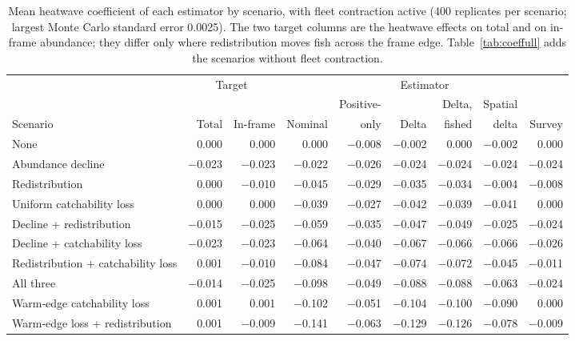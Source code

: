 \documentclass[11pt,a4paper]{article}
\begin{document}
\begin{table}[tbp]
\centering\footnotesize
\setlength{\tabcolsep}{3.5pt}
\caption{Mean heatwave coefficient of each estimator by scenario, with fleet contraction active (400 replicates per scenario; largest Monte Carlo standard error 0.0025). The two target columns are the heatwave effects on total and on in-frame abundance; they differ only where redistribution moves fish across the frame edge. Table~\ref{tab:coeffull} adds the scenarios without fleet contraction.}
\label{tab:coef}
\begin{tabular}{@{}>{\raggedright\arraybackslash}p{3.2cm}rrrrrrrr@{}}
\toprule
 & \multicolumn{2}{c}{Target} & \multicolumn{6}{c}{Estimator} \\
\cmidrule(lr){2-3}\cmidrule(l){4-9}
 & & & & Positive- & & Delta, & Spatial & \\
Scenario & Total & In-frame & Nominal & only & Delta & fished & delta & Survey \\
\midrule
None & 0.000 & 0.000 & 0.000 & $-$0.008 & $-$0.002 & 0.000 & $-$0.002 & 0.000 \\
Abundance decline & $-$0.023 & $-$0.023 & $-$0.022 & $-$0.026 & $-$0.024 & $-$0.024 & $-$0.024 & $-$0.024 \\
Redistribution & 0.000 & $-$0.010 & $-$0.045 & $-$0.029 & $-$0.035 & $-$0.034 & $-$0.004 & $-$0.008 \\
Uniform catchability loss & 0.000 & 0.000 & $-$0.039 & $-$0.027 & $-$0.042 & $-$0.039 & $-$0.041 & 0.000 \\
Decline + redistribution & $-$0.015 & $-$0.025 & $-$0.059 & $-$0.035 & $-$0.047 & $-$0.049 & $-$0.025 & $-$0.024 \\
Decline + catchability loss & $-$0.023 & $-$0.023 & $-$0.064 & $-$0.040 & $-$0.067 & $-$0.066 & $-$0.066 & $-$0.026 \\
Redistribution + catchability loss & 0.001 & $-$0.010 & $-$0.084 & $-$0.047 & $-$0.074 & $-$0.072 & $-$0.045 & $-$0.011 \\
All three & $-$0.014 & $-$0.025 & $-$0.098 & $-$0.049 & $-$0.088 & $-$0.088 & $-$0.063 & $-$0.024 \\
Warm-edge catchability loss & 0.001 & 0.001 & $-$0.102 & $-$0.051 & $-$0.104 & $-$0.100 & $-$0.090 & 0.000 \\
Warm-edge loss + redistribution & 0.001 & $-$0.009 & $-$0.141 & $-$0.063 & $-$0.129 & $-$0.126 & $-$0.078 & $-$0.009 \\
\bottomrule
\end{tabular}
\end{table}
\end{document}
